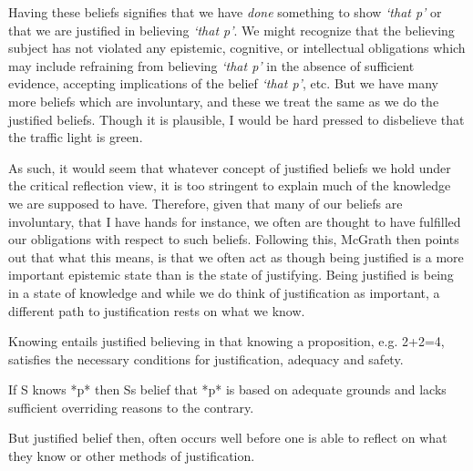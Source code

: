 \documentclass[12pt]{book}
\theoremstyle{definition}
\theoremstyle{remark}
\newcommand{\NormalTok}[1]{#1}
\newenvironment{Shaded}{}{}
\newenvironment{Highlighting}{}{}
\begin{document}
Having these beliefs signifies that we have \emph{done} something to show \emph{`that p'} or that we are justified in believing \emph{`that p'}. We might recognize that the believing subject has not violated any epistemic, cognitive, or intellectual obligations which may include refraining from believing \emph{`that p'} in the absence of sufficient evidence, accepting implications of the belief \emph{`that p'}, etc. But we have many more beliefs which are involuntary, and these we treat the same as we do the justified beliefs. Though it is plausible, I would be hard pressed to disbelieve that the traffic light is green.

As such, it would seem that whatever concept of justified beliefs we hold under the critical reflection view, it is too stringent to explain much of the knowledge we are supposed to have. Therefore, given that many of our beliefs are involuntary, that I have hands for instance, we often are thought to have fulfilled our obligations with respect to such beliefs. Following this, McGrath then points out that what this means, is that we often act as though being justified is a more important epistemic state than is the state of justifying. Being justified is being in a state of knowledge and while we do think of justification as important, a different path to justification rests on what we know.

\begin{Shaded}
\begin{Highlighting}[]

\NormalTok{Knowing entails justified believing in that knowing a proposition, e.g. 2+2=4, satisfies the necessary conditions for justification, adequacy and safety.}
\end{Highlighting}
\end{Shaded}

\begin{Shaded}
\begin{Highlighting}[]

\NormalTok{If S knows *p* then S\textquotesingle{}s belief that *p* is based on adequate grounds and lacks sufficient overriding reasons to the contrary.}
\end{Highlighting}
\end{Shaded}

\begin{Shaded}
\begin{Highlighting}[]

\NormalTok{But justified belief then, often occurs well before one is able to reflect on what they know or other methods of justification.}
\end{Highlighting}
\end{Shaded}
\end{document}
